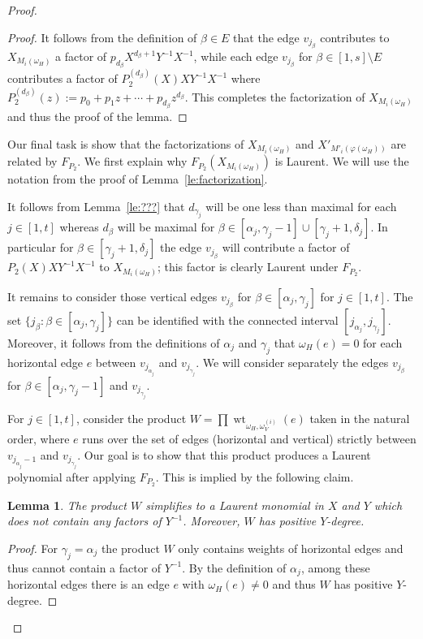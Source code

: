 \documentclass{amsart}
\newtheorem{lemma}[theorem]{Lemma}
\newcommand{\wt}{\operatorname{wt}}
\begin{document}
\begin{proof}
\begin{proof}
   It follows from the definition of $\beta\in E$ that the edge $v_{j_\beta}$ contributes to $X_{M_i(\omega_H)}$ a factor of $p_{d_\beta}X^{d_\beta+1}Y^{-1}X^{-1}$, while each edge $v_{j_\beta}$ for $\beta\in[1,s]\setminus E$ contributes a factor of $P_2^{(d_\beta)}(X)XY^{-1}X^{-1}$ where $P_2^{(d_\beta)}(z):=p_0+p_1z+\cdots+p_{d_\beta}z^{d_\beta}$.  This completes the factorization of $X_{M_i(\omega_H)}$ and thus the proof of the lemma.
  \end{proof}
 
  Our final task is show that the factorizations of $X_{M_i(\omega_H)}$ and $X'_{M'_i(\varphi(\omega_H))}$ are related by $F_{P_2}$.  We first explain why $F_{P_2}(X_{M_i(\omega_H)})$ is Laurent.  We will use the notation from the proof of Lemma~\ref{le:factorization}.  

  It follows from Lemma~\ref{le:???} that $d_{\gamma_j}$ will be one less than maximal for each $j\in[1,t]$ whereas $d_\beta$ will be maximal for $\beta\in[\alpha_j,\gamma_j-1]\cup[\gamma_j+1,\delta_j]$.  In particular for $\beta\in[\gamma_j+1,\delta_j]$ the edge $v_{j_\beta}$ will contribute a factor of $P_2(X)XY^{-1}X^{-1}$ to $X_{M_i(\omega_H)}$; this factor is clearly Laurent under $F_{P_2}$.  

  It remains to consider those vertical edges $v_{j_\beta}$ for $\beta\in[\alpha_j,\gamma_j]$ for $j\in[1,t]$. The set $\{j_\beta:\beta\in[\alpha_j,\gamma_j]\}$ can be identified with the connected interval $[j_{\alpha_j},j_{\gamma_j}]$.  Moreover, it follows from the definitions of $\alpha_j$ and $\gamma_j$ that $\omega_H(e)=0$ for each horizontal edge $e$ between $v_{j_{\alpha_j}}$ and $v_{j_{\gamma_j}}$.  We will consider separately the edges $v_{j_\beta}$ for $\beta\in[\alpha_j,\gamma_j-1]$ and $v_{j_{\gamma_j}}$.  

  For $j\in[1,t]$, consider the product $W=\prod\wt_{\omega_H,\omega_V^{(i)}}(e)$ taken in the natural order, where $e$ runs over the set of edges (horizontal and vertical) strictly between $v_{j_{\alpha_j}-1}$ and $v_{j_{\gamma_j}}$.  Our goal is to show that this product produces a Laurent polynomial after applying $F_{P_2}$.  This is implied by the following claim.
  \begin{lemma}
   The product $W$ simplifies to a Laurent monomial in $X$ and $Y$ which does not contain any factors of $Y^{-1}$.  Moreover, $W$ has positive $Y$-degree.
  \end{lemma}
  \begin{proof}
   For $\gamma_j=\alpha_j$ the product $W$ only contains weights of horizontal edges and thus cannot contain a factor of $Y^{-1}$.  By the definition of $\alpha_j$, among these horizontal edges there is an edge $e$ with $\omega_H(e)\ne0$ and thus $W$ has positive $Y$-degree.


\end{proof}
\end{proof}
\end{document}
